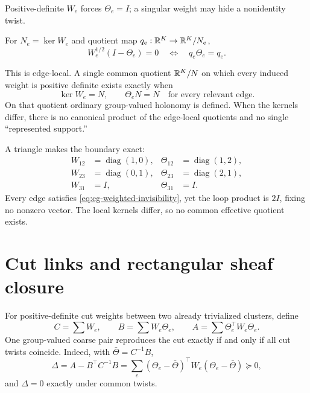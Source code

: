 Positive-definite \(W_e\) forces \(\Theta_e=I\); a singular weight may hide a
nonidentity twist. 

For \(N_e=\ker W_e\) and quotient map \(q_e:\mathbb R^K\to\mathbb R^K/N_e\),
\begin{equation}
W_e^{1/2}(I-\Theta_e)=0
\quad\Longleftrightarrow\quad
q_e\Theta_e=q_e.
\label{eq:cg-edge-quotient}
\end{equation}

This is edge-local. A single common quotient
\(\mathbb R^K/N\) on which every induced weight is positive definite exists exactly
when
\begin{equation}
\ker W_e=N,\qquad \Theta_eN=N
\quad\text{for every relevant edge}.
\label{eq:cg-common-quotient}
\end{equation}
On that quotient ordinary group-valued holonomy is defined. When the kernels
differ, there is no canonical product of the edge-local quotients and no
single ``represented support.'' 

A triangle makes the boundary exact:
\[
\begin{aligned}
W_{12}&=\operatorname{diag}(1,0),&
\Theta_{12}&=\operatorname{diag}(1,2),\\
W_{23}&=\operatorname{diag}(0,1),&
\Theta_{23}&=\operatorname{diag}(2,1),\\
W_{31}&=I,&\Theta_{31}&=I.
\end{aligned}
\]
Every edge satisfies \eqref{eq:cg-weighted-invisibility}, yet the loop product
is \(2I\), fixing no nonzero vector. The local kernels differ, so no common
effective quotient exists. 

\section{Cut links and rectangular sheaf closure}
\label{sec:cg-sheaf-closure}

For positive-definite cut weights between two already trivialized clusters,
define
\[
C=\sum W_e,\qquad B=\sum W_e\Theta_e,\qquad
A=\sum\Theta_e^\top W_e\Theta_e.
\]
One group-valued coarse pair reproduces the cut exactly if and only if all
cut twists coincide. Indeed, with \(\bar\Theta=C^{-1}B\),
\begin{equation}
\Delta=A-B^\top C^{-1}B
=\sum_e(\Theta_e-\bar\Theta)^\top W_e
(\Theta_e-\bar\Theta)\succeq0,
\label{eq:cg-cut-excess}
\end{equation}
and \(\Delta=0\) exactly under common twists. 

